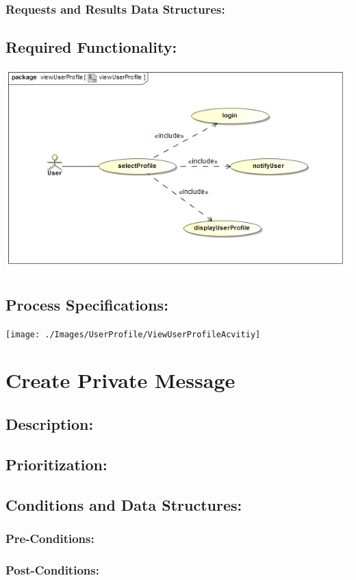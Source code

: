 \documentclass[a4paper,11pt]{article}
\begin{document}
\subsubsection*{Requests and Results Data Structures:}
\subsection{Required Functionality:} 
\includegraphics[width=1\linewidth]{./Images/UserProfile/ViewUserProfileUseCase}
\subsection{Process Specifications:} 
\texttt{[image: ./Images/UserProfile/ViewUserProfileAcvitiy]}
\section{Create Private Message}
\subsection*{Description:}
\subsection{Prioritization:} 
\subsection{Conditions and Data Structures:}
\subsubsection*{Pre-Conditions:}
\subsubsection*{Post-Conditions:}
\end{document}
